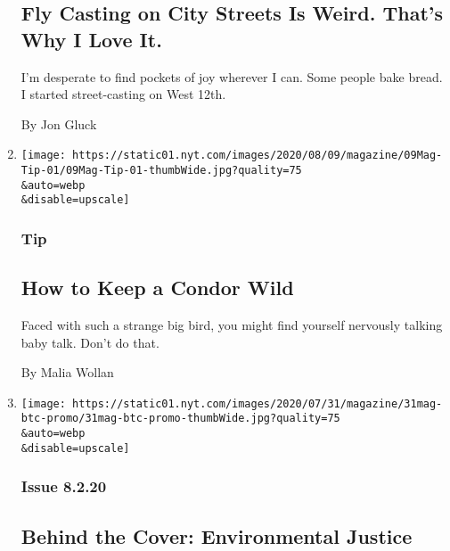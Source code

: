 \begin{enumerate}
  \hypertarget{fly-casting-on-city-streets-is-weird-thats-why-i-love-it}{%
  \subsection{Fly Casting on City Streets Is Weird. That's Why I Love
  It.}\label{fly-casting-on-city-streets-is-weird-thats-why-i-love-it}}

  I'm desperate to find pockets of joy wherever I can. Some people bake
  bread. I started street-casting on West 12th.

  By Jon Gluck
\item
  \href{/2020/08/04/magazine/condors-yurok-tribe.html}{}

  \texttt{[image: https://static01.nyt.com/images/2020/08/09/magazine/09Mag-Tip-01/09Mag-Tip-01-thumbWide.jpg?quality=75\\\&auto=webp\\\&disable=upscale]}

  \hypertarget{tip-}{%
  \subsubsection{Tip }\label{tip-}}

  \hypertarget{how-to-keep-a-condor-wild}{%
  \subsection{How to Keep a Condor
  Wild}\label{how-to-keep-a-condor-wild}}

  Faced with such a strange big bird, you might find yourself nervously
  talking baby talk. Don't do that.

  By Malia Wollan
\item
  \href{/2020/07/31/magazine/behind-the-cover-environmental-justice.html}{}

  \texttt{[image: https://static01.nyt.com/images/2020/07/31/magazine/31mag-btc-promo/31mag-btc-promo-thumbWide.jpg?quality=75\\\&auto=webp\\\&disable=upscale]}

  \hypertarget{issue-8220}{%
  \subsubsection{Issue 8.2.20}\label{issue-8220}}

  \hypertarget{behind-the-cover-environmental-justice}{%
  \subsection{Behind the Cover: Environmental
  Justice}\label{behind-the-cover-environmental-justice}}


\end{enumerate}
